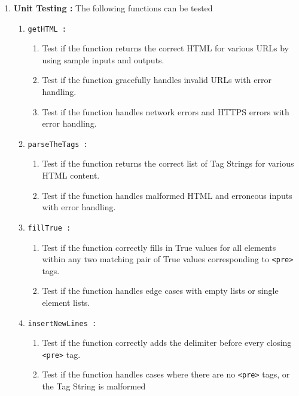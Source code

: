 \documentclass[12pt]{scrreprt}
\begin{document}
\begin{enumerate}
    \item \textbf{Unit Testing : } The following functions can be tested 
    \begin{enumerate}
        \item \texttt{getHTML : }
        \begin{enumerate}
            \item Test if the function returns the correct HTML for various URLs by using sample inputs and outputs.
            \item Test if the function gracefully handles invalid URLs with error handling.
            \item Test if the function handles network errors and HTTPS errors with error handling.
        \end{enumerate}

        \item \texttt{parseTheTags : }
        \begin{enumerate}
            \item Test if the function returns the correct list of Tag Strings for various HTML content.
            \item Test if the function handles malformed HTML and erroneous inputs with error handling.
        \end{enumerate}

        \item \texttt{fillTrue : }
        \begin{enumerate}
            \item Test if the function correctly fills in True values for all elements within any two matching pair of True values corresponding to \texttt{<pre>} tags.
            \item Test if the function handles edge cases with empty lists or single element lists.
        \end{enumerate}

        \item \texttt{insertNewLines : }
        \begin{enumerate}
            \item Test if the function correctly adds the delimiter before every closing \texttt{<pre>} tag.
            \item Test if the function handles cases where there are no \texttt{<pre>} tags, or the Tag String is malformed 
        \end{enumerate}


\end{enumerate}
\end{enumerate}
\end{document}
